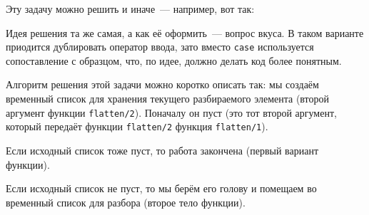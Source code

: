 \documentclass[
  paper=a4,
  fontsize=14pt,
  openany,
  appendixprefix=true
]{scrbook}
\begin{document}
























Эту задачу можно решить и иначе~--- например, вот так:



Идея решения та же самая, а как её оформить~--- вопрос вкуса. В таком варианте приодится дублировать оператор ввода, зато вместо \lstinline{case} используется сопоставление с образцом, что, по идее, должно делать код более понятным.











Алгоритм решения этой задачи можно коротко описать так: мы создаём временный список для хранения текущего разбираемого элемента (второй аргумент функции \lstinline{flatten/2}). Поначалу он пуст (это тот второй аргумент, который передаёт функции \lstinline{flatten/2} функция \lstinline{flatten/1}).

Если исходный список тоже пуст, то работа закончена (первый вариант функции).

Если исходный список не пуст, то мы берём его голову и помещаем во временный список для разбора (второе тело функции).
\end{document}

